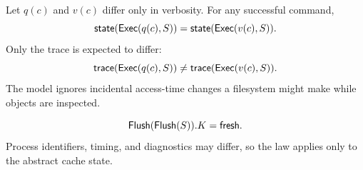 \begin{law}
\label{law:verbose}
Let $q(c)$ and $v(c)$ differ only in verbosity.  For any successful command,
\[
\mathsf{state}(\mathsf{Exec}(q(c),S))=\mathsf{state}(\mathsf{Exec}(v(c),S)).
\]
Only the trace is expected to differ:
\[
\mathsf{trace}(\mathsf{Exec}(q(c),S))\ne\mathsf{trace}(\mathsf{Exec}(v(c),S)).
\]
The model ignores incidental access-time changes a filesystem might make while
objects are inspected.
\end{law}

\begin{law}
\label{law:flush}
\[
  \mathsf{Flush}(\mathsf{Flush}(S)).K=\mathsf{fresh}.
\]
Process identifiers, timing, and diagnostics may differ, so the law applies
only to the abstract cache state.
\end{law}
